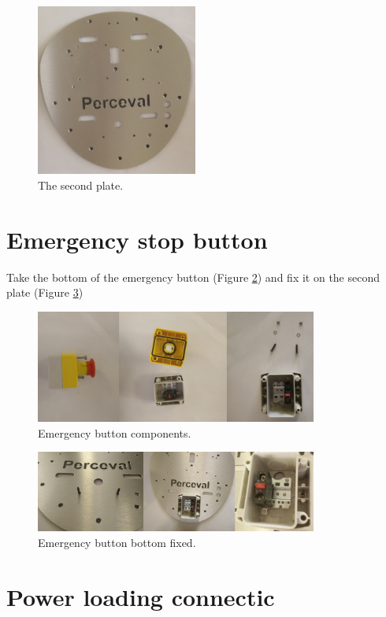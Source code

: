 \documentclass[10pt,a4paper]{report}   %
\begin{document}
\begin{figure}[H]
\center
\includegraphics[width=200px]{images/50.jpg}
\caption{The second plate.}
\label{fig:50}
\end{figure}

\section{Emergency stop button}

Take the bottom of the emergency button (Figure \ref{fig:51}) and fix it on the second plate (Figure \ref{fig:52})

\begin{figure}[H]
\center
\includegraphics[width=350px]{images/51.jpg}
\caption{Emergency button components.}
\label{fig:51}
\end{figure}

\begin{figure}[H]
\center
\includegraphics[width=350px]{images/52.jpg}
\caption{Emergency button bottom fixed.}
\label{fig:52}
\end{figure}

\section{Power loading connectic}
\end{document}
